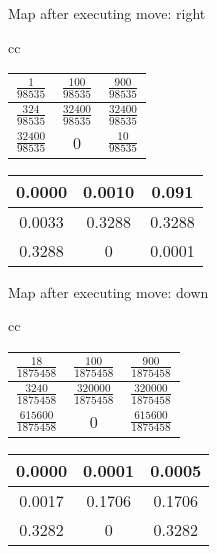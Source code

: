 \noindent
Map after executing move: right \\
\begin{center}
\begin{tabular}{cc}%
\begin{tabular}[t]{ |c|c|c| }
 \hline
 $ \frac{1}{98535} $       &  $ \frac{100}{98535}$      &  $\frac{900}{98535} $\\
 \hline
  $\frac{324}{98535}$      &  $\frac{32400}{98535}$     &  $\frac{32400}{98535}$ \\
 \hline
  $\frac{32400}{98535}$    &  0                         &  $\frac{10}{98535} $\\
 \hline
\end{tabular}

\begin{tabular}[t]{ |c|c|c| }
 \hline
  0.0000   &  0.0010   &  0.091 \\
 \hline
  0.0033   &  0.3288   &  0.3288 \\
 \hline
  0.3288   &  0        & 0.0001  \\
 \hline
\end{tabular}
\end{tabular}
\end{center}

\newpage
\noindent
Map after executing move: down
\begin{center}
\begin{tabular}{cc}%
\begin{tabular}[t]{ |c|c|c| }
 \hline
 $ \frac{18}{1875458} $       &  $ \frac{100}{1875458}$    &  $\frac{900}{1875458} $ \\
  \hline
  $\frac{3240}{1875458}$      &  $\frac{320000}{1875458}$  &  $\frac{320000}{1875458}$ \\
 \hline
  $\frac{615600}{1875458}$    &  0                         &  $\frac{615600}{1875458} $\\
 \hline
\end{tabular}

\begin{tabular}[t]{ |c|c|c| }
 \hline
  0.0000  &  0.0001  &  0.0005 \\
 \hline
  0.0017   & 0.1706   & 0.1706 \\
 \hline
  0.3282      &   0   & 0.3282 \\
 \hline
 \end{tabular}
 \end{tabular}
 \end{center}

